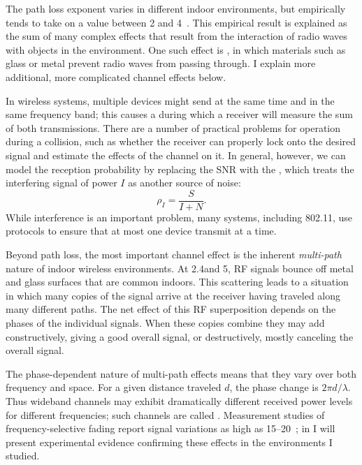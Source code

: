 The path loss exponent varies in different indoor environments, but empirically tends to take on a value between 2 and 4~\cite{Sklar}. This empirical result is explained as the sum of many complex effects that result from the interaction of radio waves with objects in the environment. One such effect is , in which materials such as glass or metal prevent radio waves from passing through. I explain more additional, more complicated channel effects below.

In wireless systems, multiple devices might send at the same time and in the same frequency band; this  causes a  during which a receiver will measure the sum of both transmissions. There are a number of practical problems for operation during a collision, such as whether the receiver can properly lock onto the desired signal and estimate the effects of the channel on it. In general, however, we can model the reception probability by replacing the SNR with the , which treats the interfering signal of power $I$ as another source of noise:
\begin{equation}
\label{eq:sinr}
\rho_I = \frac{S}{I+N}.
\end{equation}
While interference is an important problem, many systems, including 802.11, use  protocols to ensure that at most one device transmit at a time.

Beyond path loss, the most important channel effect is the inherent \emph{multi-path} nature of indoor wireless environments. At 2.4\GHz and 5\GHz, RF signals bounce off metal and glass surfaces that are common indoors. This scattering leads to a situation in which many copies of the signal arrive at the receiver having traveled along many different paths. The net effect of this RF superposition depends on the phases of the individual signals. When these copies combine they may add constructively, giving a good overall signal, or destructively, mostly canceling the overall signal.

The phase-dependent nature of multi-path effects means that they vary over both frequency and space. For a given distance traveled $d$, the phase change is $2\pi d/\lambda$. Thus wideband channels may exhibit dramatically different received power levels for different frequencies; such channels are called . Measurement studies of frequency-selective fading report signal variations as high as 15--20\dB~\cite{Judd_CHARM}; in  I will present experimental evidence confirming these effects in the environments I studied.

